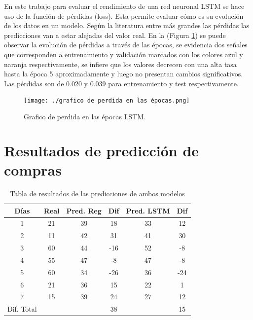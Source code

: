 En este trabajo para evaluar el rendimiento de una red neuronal LSTM se hace uso de la función de pérdidas (loss). Esta permite evaluar cómo es su evolución
de los datos en un modelo. Según la literatura entre más grandes las pérdidas
las predicciones van a estar alejadas del valor real. En la (Figura
\ref{fig:perdida}) se puede observar la evolución de pérdidas a través de las
épocas, se evidencia dos señales que corresponden a entrenamiento y validación
marcados con los colores azul y naranja respectivamente, se infiere que los
valores decrecen con una alta tasa hasta la época 5 aproximadamente y luego no
presentan cambios significativos. Las pérdidas son de 0.020 y 0.039 para
entrenamiento y test respectivamente.

\begin{figure}[H]
  \begin{center}
    \texttt{[image: ./grafico de perdida en las épocas.png]}
    \caption{Grafico de perdida en las épocas LSTM.}
    \label{fig:perdida}
  \end{center}
\end{figure}
\section{Resultados de predicción de compras}

\begin{table}[H]
  \centering
  \begin{tabular}{|c|c|c|c|c|c|}
    \hline
    \rowcolor{gray!50} \textbf{Días} & \textbf{Real} & \textbf{Pred. Reg} & \textbf{Dif} & \textbf{Pred. LSTM} & \textbf{Dif} \\
    \hline
    1 & 21 & 39 & 18 & 33 & 12 \\
    \hline
    2 & 11 & 42 & 31 & 41 & 30 \\
    \hline
    3 & 60 & 44 & -16 & 52 & -8 \\
    \hline
    4 & 55 & 47 & -8 & 47 & -8 \\
    \hline
    5 & 60 & 34 & -26 & 36 & -24 \\
    \hline
    6 & 21 & 36 & 15 & 22 & 1 \\
    \hline
    7 & 15 & 39 & 24 & 27 & 12 \\
    \hline
    Dif. Total &  &  & 38 &  & 15 \\
    \hline
  \end{tabular}
  \caption{ Tabla de resultados de las predicciones de ambos modelos}
  \label{tab:prediccion_final}
\end{table}

